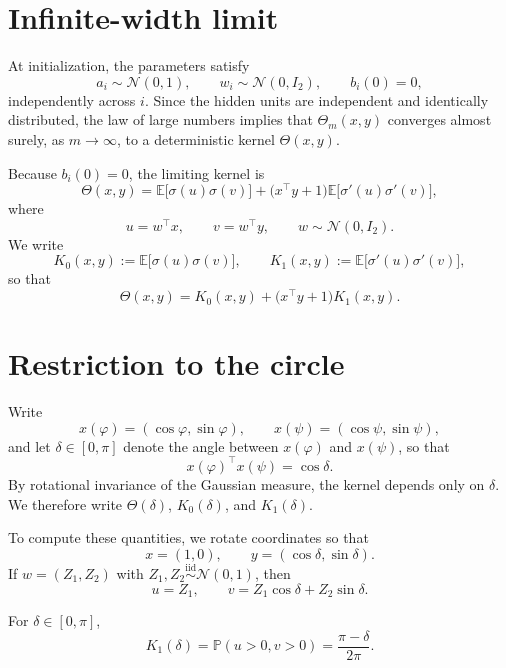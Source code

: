 \section{Infinite-width limit}
\label{sec:app-ntk-limit}

At initialization, the parameters satisfy
\[
	a_i\sim \mathcal N(0,1),
	\qquad
	w_i\sim \mathcal N(0,I_2),
	\qquad
	b_i(0)=0,
\]
independently across \(i\). Since the hidden units are independent and identically distributed,
the law of large numbers implies that \(\Theta_m(x,y)\) converges almost surely, as
\(m\to\infty\), to a deterministic kernel \(\Theta(x,y)\).

Because \(b_i(0)=0\), the limiting kernel is
\begin{equation}
	\Theta(x,y)
	=
	\mathbb E\bigl[\sigma(u)\sigma(v)\bigr]
	+
	\bigl(x^\top y+1\bigr)\mathbb E\bigl[\sigma'(u)\sigma'(v)\bigr],
	\label{eq:app-limit-kernel-general}
\end{equation}
where
\[
	u=w^\top x,
	\qquad
	v=w^\top y,
	\qquad
	w\sim \mathcal N(0,I_2).
\]
We write
\[
	K_0(x,y):=\mathbb E\bigl[\sigma(u)\sigma(v)\bigr],
	\qquad
	K_1(x,y):=\mathbb E\bigl[\sigma'(u)\sigma'(v)\bigr],
\]
so that
\[
	\Theta(x,y)=K_0(x,y)+\bigl(x^\top y+1\bigr)K_1(x,y).
\]

\section{Restriction to the circle}
\label{sec:app-kernel-on-circle}

Write
\[
	x(\varphi)=(\cos\varphi,\sin\varphi),
	\qquad
	x(\psi)=(\cos\psi,\sin\psi),
\]
and let \(\delta\in[0,\pi]\) denote the angle between \(x(\varphi)\) and \(x(\psi)\), so that
\[
	x(\varphi)^\top x(\psi)=\cos\delta.
\]
By rotational invariance of the Gaussian measure, the kernel depends only on \(\delta\). We
therefore write \(\Theta(\delta)\), \(K_0(\delta)\), and \(K_1(\delta)\).

To compute these quantities, we rotate coordinates so that
\[
	x=(1,0),
	\qquad
	y=(\cos\delta,\sin\delta).
\]
If \(w=(Z_1,Z_2)\) with \(Z_1,Z_2\overset{\mathrm{iid}}{\sim}\mathcal N(0,1)\), then
\[
	u=Z_1,
	\qquad
	v=Z_1\cos\delta+Z_2\sin\delta.
\]

\begin{lemma}
	\label{lem:app-K1}
	For \(\delta\in[0,\pi]\),
	\begin{equation}
		K_1(\delta)=\mathbb P(u>0,v>0)=\frac{\pi-\delta}{2\pi}.
		\label{eq:app-K1-explicit}
	\end{equation}
\end{lemma}

